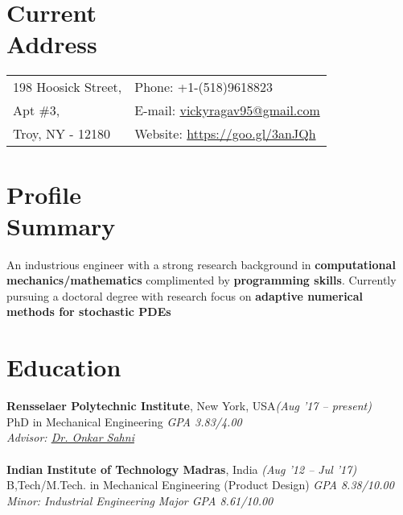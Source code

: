 \documentclass[margin,line]{res}
\begin{document}

\begin{resume}
\section{\sc Current\\ Address}
\begin{tabular}{@{}p{3.8in}p{3in}}
198 Hoosick Street,            & {Phone:} +1-(518)9618823 \\
Apt \#3, & {E-mail:} \href{mailto:vickyragav95@gmail.com}{\color {RoyalPurple} vickyragav95@gmail.com}\\
Troy, NY - 12180 & {Website: }{\href {https://goo.gl/3anJQh} {\color {RoyalPurple} https://goo.gl/3anJQh}}\\
\end{tabular}

\section{\sc Profile \\Summary}
	An industrious engineer with a strong research background in {\bf computational mechanics/mathematics} complimented by {\bf programming skills}. Currently pursuing a doctoral degree with research focus on {\bf adaptive numerical methods for stochastic PDEs} 
\section{\sc Education}
{\bf Rensselaer Polytechnic Institute}, New York, USA\hfill {\em (Aug '17 -- present)}\\
PhD in Mechanical Engineering \hfill{\em GPA 3.83/4.00}\\
{\em Advisor: \href {http://homepages.rpi.edu/~sahni/} {\color{RoyalPurple} Dr. Onkar Sahni}}\\\\
{\bf Indian Institute of Technology Madras}, India \hfill {\em (Aug '12 -- Jul '17)}\\
B,Tech/M.Tech. in Mechanical Engineering (Product Design) \hfill{\em GPA 8.38/10.00}\\
{\em Minor: Industrial Engineering} \hfill {\em Major GPA 8.61/10.00}



\end{resume}
\end{document}
